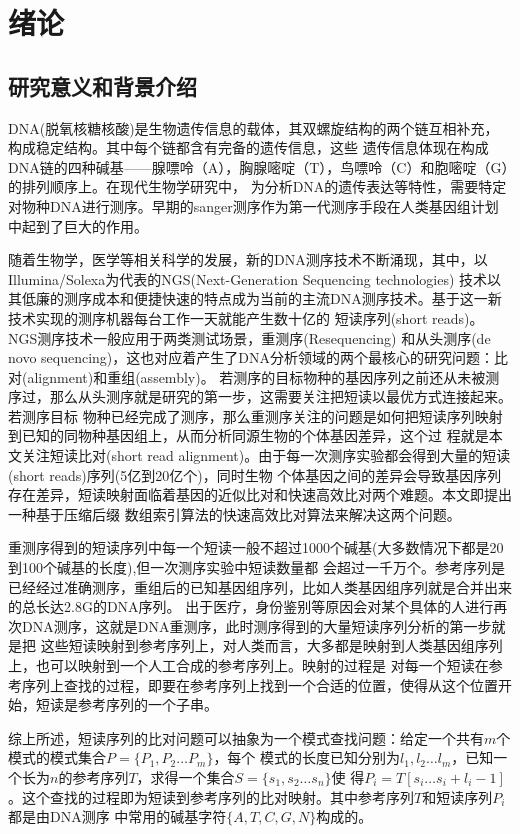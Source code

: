 \chapter{绪论}
\label{chap:introduction}

\section{研究意义和背景介绍}

DNA(脱氧核糖核酸)是生物遗传信息的载体，其双螺旋结构的两个链互相补充，构成稳定结构。其中每个链都含有完备的遗传信息，这些
遗传信息体现在构成DNA链的四种碱基——腺嘌呤（A），胸腺嘧啶（T），鸟嘌呤（C）和胞嘧啶（G）的排列顺序上。在现代生物学研究中，
为分析DNA的遗传表达等特性，需要特定对物种DNA进行测序。早期的sanger测序作为第一代测序手段在人类基因组计划中起到了巨大的作用。

随着生物学，医学等相关科学的发展，新的DNA测序技术不断涌现，其中，以Illumina/Solexa为代表的NGS(Next-Generation Sequencing technologies)
技术以其低廉的测序成本和便捷快速的特点成为当前的主流DNA测序技术。基于这一新技术实现的测序机器每台工作一天就能产生数十亿的
短读序列(short reads)\cite{metzker2009sequencing}。NGS测序技术一般应用于两类测试场景，重测序(Resequencing)
和从头测序(de novo sequencing)，这也对应着产生了DNA分析领域的两个最核心的研究问题：比对(alignment)和重组(assembly)。
若测序的目标物种的基因序列之前还从未被测序过，那么从头测序就是研究的第一步，这需要关注把短读以最优方式连接起来。若测序目标
物种已经完成了测序，那么重测序关注的问题是如何把短读序列映射到已知的同物种基因组上，从而分析同源生物的个体基因差异，这个过
程就是本文关注短读比对(short read alignment)。由于每一次测序实验都会得到大量的短读(short reads)序列(5亿到20亿个)，同时生物
个体基因之间的差异会导致基因序列存在差异，短读映射面临着基因的近似比对和快速高效比对两个难题。本文即提出一种基于压缩后缀
数组索引算法的快速高效比对算法来解决这两个问题。

重测序得到的短读序列中每一个短读一般不超过1000个碱基(大多数情况下都是20到100个碱基的长度),但一次测序实验中短读数量都
会超过一千万个。参考序列是已经经过准确测序，重组后的已知基因组序列，比如人类基因组序列就是合并出来的总长达2.8G的DNA序列。
出于医疗，身份鉴别等原因会对某个具体的人进行再次DNA测序，这就是DNA重测序，此时测序得到的大量短读序列分析的第一步就是把
这些短读映射到参考序列上，对人类而言，大多都是映射到人类基因组序列上，也可以映射到一个人工合成的参考序列上。映射的过程是
对每一个短读在参考序列上查找的过程，即要在参考序列上找到一个合适的位置，使得从这个位置开始，短读是参考序列的一个子串。

综上所述，短读序列的比对问题可以抽象为一个模式查找问题：给定一个共有$m$个模式的模式集合$P=\{P_1,P_2\ldots P_m\}$，每个
模式的长度已知分别为$l_1,l_2\ldots l_m$，已知一个长为$n$的参考序列$T$，求得一个集合$S=\{s_1,s_2\ldots s_n\}$使
得$P_i=T[s_i\ldots s_i+l_i-1]$。这个查找的过程即为短读到参考序列的比对映射。其中参考序列$T$和短读序列$P_i$都是由DNA测序
中常用的碱基字符$\{A,T,C,G,N\}$构成的。

